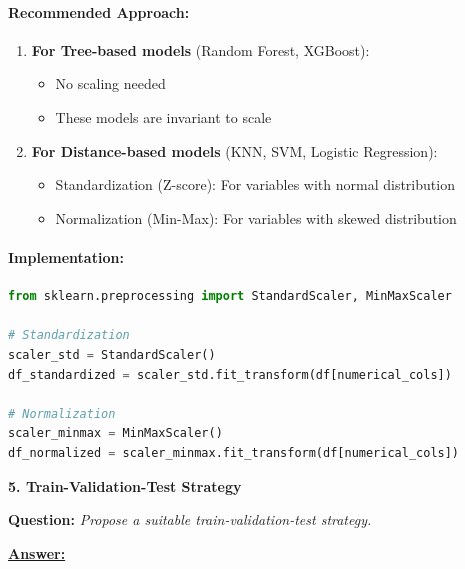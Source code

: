 \documentclass[11pt,a4paper]{article}
\newcommand{\questiontitle}[2]{%
    \vspace{0.4cm}%
    \noindent\textbf{\large\color{headerblue}#1. #2}\par\vspace{0.15cm}%
}
\newcommand{\qprompt}[1]{%
    \noindent\textbf{Question:} \textit{#1}\par\vspace{0.2cm}%
}
\newcommand{\answer}{\noindent\textbf{\underline{Answer:}}\par\vspace{0.15cm}}
\begin{document}
\paragraph{Recommended Approach:}
\begin{enumerate}
    \item \textbf{For Tree-based models} (Random Forest, XGBoost):
    \begin{itemize}
        \item No scaling needed
        \item These models are invariant to scale
    \end{itemize}
    \item \textbf{For Distance-based models} (KNN, SVM, Logistic Regression):
    \begin{itemize}
        \item Standardization (Z-score): For variables with normal distribution
        \item Normalization (Min-Max): For variables with skewed distribution
    \end{itemize}
\end{enumerate}

\paragraph{Implementation:}
\begin{lstlisting}[language=Python]
from sklearn.preprocessing import StandardScaler, MinMaxScaler

# Standardization
scaler_std = StandardScaler()
df_standardized = scaler_std.fit_transform(df[numerical_cols])

# Normalization
scaler_minmax = MinMaxScaler()
df_normalized = scaler_minmax.fit_transform(df[numerical_cols])
\end{lstlisting}

\vspace{0.35cm}

\questiontitle{5}{Train-Validation-Test Strategy}
\qprompt{Propose a suitable train-validation-test strategy.}
\answer
\end{document}
